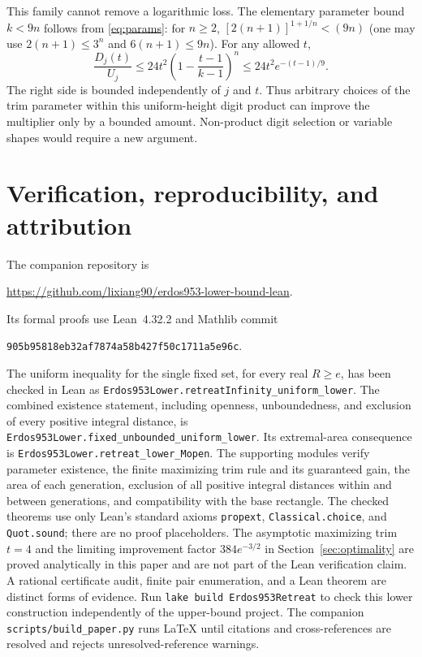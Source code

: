 \documentclass[11pt,a4paper]{article}
\theoremstyle{remark}\newtheorem{remark}[theorem]{Remark}
\begin{document}
This family cannot remove a logarithmic loss. The elementary parameter bound
$k<9n$ follows from \eqref{eq:params}: for $n\ge2$,
$[2(n+1)]^{1+1/n}<(9n)$ (one may use
$2(n+1)\le3^n$ and $6(n+1)\le9n$).
For any allowed $t$,
\[
 \frac{D_j(t)}{U_j}\le24t^2
    \left(1-\frac{t-1}{k-1}\right)^n
 \le24t^2 e^{-(t-1)/9}.
\]
The right side is bounded independently of $j$ and $t$. Thus arbitrary
choices of the trim parameter within this uniform-height digit product
can improve the multiplier only by a bounded amount. Non-product digit
selection or variable shapes would require a new argument.

\section{Verification, reproducibility, and attribution}
The companion repository is
\par\noindent\url{https://github.com/lixiang90/erdos953-lower-bound-lean}.
\par\noindent
Its formal proofs use Lean~4.32.2 and Mathlib commit
\par\noindent\texttt{905b95818eb32af7874a58b427f50c1711a5e96c}.
\par\noindent
The uniform inequality for the single fixed set, for every real $R\ge e$,
has been checked in Lean as
\texttt{Erdos953Lower.retreatInfinity\_uniform\_lower}.
The combined existence statement, including openness, unboundedness,
and exclusion of every positive integral distance, is
\texttt{Erdos953Lower.fixed\_unbounded\_uniform\_lower}.
Its extremal-area consequence is
\texttt{Erdos953Lower.retreat\_lower\_Mopen}.
The supporting modules verify parameter existence, the finite maximizing
trim rule and its guaranteed gain, the area of each generation, exclusion
of all positive integral distances within and between generations, and
compatibility with the base rectangle. The checked theorems use only
Lean's standard axioms \texttt{propext}, \texttt{Classical.choice}, and
\texttt{Quot.sound}; there are no proof placeholders.
The asymptotic maximizing trim $t=4$ and the limiting improvement factor
$384e^{-3/2}$ in Section~\ref{sec:optimality} are proved analytically in
this paper and are not part of the Lean verification claim.
A rational certificate audit, finite pair enumeration, and a Lean theorem
are distinct forms of evidence. Run \texttt{lake build Erdos953Retreat}
to check this lower construction independently of the upper-bound project.
The companion \texttt{scripts/build\_paper.py} runs LaTeX until citations
and cross-references are resolved and rejects unresolved-reference warnings.
\end{document}
